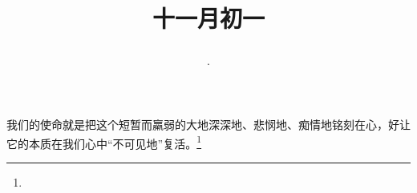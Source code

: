 \title{\date[d=1,m=12,y=2024][year:cn-y,年,month:cn,day:cn,日,·,weekday]·十一月初一 }
我们的使命就是把这个短暂而羸弱的大地深深地、悲悯地、痴情地铭刻在心，好让它的本质在我们心中“不可见地”复活。\footnote{ }

